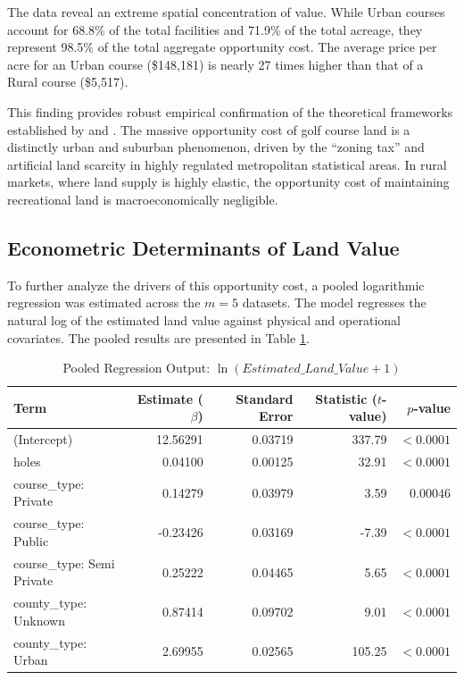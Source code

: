 \documentclass[10pt, letterpaper]{article}
\begin{document}
The data reveal an extreme spatial concentration of value. While Urban courses account for 68.8\% of the total facilities and 71.9\% of the total acreage, they represent 98.5\% of the total aggregate opportunity cost. The average price per acre for an Urban course (\$148,181) is nearly 27 times higher than that of a Rural course (\$5,517). 

This finding provides robust empirical confirmation of the theoretical frameworks established by \textcite{Davis2021} and \textcite{Glaeser2005}. The massive opportunity cost of golf course land is a distinctly urban and suburban phenomenon, driven by the ``zoning tax'' and artificial land scarcity in highly regulated metropolitan statistical areas. In rural markets, where land supply is highly elastic, the opportunity cost of maintaining recreational land is macroeconomically negligible.

\subsection{Econometric Determinants of Land Value}
To further analyze the drivers of this opportunity cost, a pooled logarithmic regression was estimated across the $m=5$ datasets. The model regresses the natural log of the estimated land value against physical and operational covariates. The pooled results are presented in Table \ref{tab:regression}.

\begin{table}[h!]
\centering
\caption{Pooled Regression Output: $\ln(Estimated\_Land\_Value + 1)$}
\label{tab:regression}
\renewcommand{\arraystretch}{1.2}
\begin{tabular}{l r r r r}
\hline
\textbf{Term} & \textbf{Estimate ($\beta$)} & \textbf{Standard Error} & \textbf{Statistic ($t$-value)} & \textbf{$p$-value} \\
\hline
(Intercept) & 12.56291 & 0.03719 & 337.79 & $< 0.0001$ \\
holes & 0.04100 & 0.00125 & 32.91 & $< 0.0001$ \\
course\_type: Private & 0.14279 & 0.03979 & 3.59 & $0.00046$ \\
course\_type: Public & -0.23426 & 0.03169 & -7.39 & $< 0.0001$ \\
course\_type: Semi Private & 0.25222 & 0.04465 & 5.65 & $< 0.0001$ \\
county\_type: Unknown & 0.87414 & 0.09702 & 9.01 & $< 0.0001$ \\
county\_type: Urban & 2.69955 & 0.02565 & 105.25 & $< 0.0001$ \\
\hline
\end{tabular}
\end{table}
\end{document}
